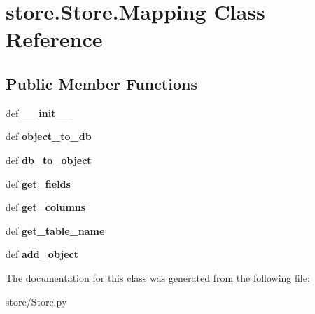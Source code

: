 \hypertarget{classstore_1_1_store_1_1_mapping}{\section{store.\-Store.\-Mapping Class Reference}
\label{classstore_1_1_store_1_1_mapping}
}
\subsection*{Public Member Functions}
\begin{DoxyCompactItemize}
\item 
\hypertarget{classstore_1_1_store_1_1_mapping_a0e1dbdc7010d1a0996c756faa297e701}{def {\bfseries \-\_\-\-\_\-init\-\_\-\-\_\-}}\label{classstore_1_1_store_1_1_mapping_a0e1dbdc7010d1a0996c756faa297e701}

\item 
\hypertarget{classstore_1_1_store_1_1_mapping_af5051c6fc20b5606cc31c03c3748819a}{def {\bfseries object\-\_\-to\-\_\-db}}\label{classstore_1_1_store_1_1_mapping_af5051c6fc20b5606cc31c03c3748819a}

\item 
\hypertarget{classstore_1_1_store_1_1_mapping_a66d071f84316d5d59cc8540c773bc3b3}{def {\bfseries db\-\_\-to\-\_\-object}}\label{classstore_1_1_store_1_1_mapping_a66d071f84316d5d59cc8540c773bc3b3}

\item 
\hypertarget{classstore_1_1_store_1_1_mapping_ac9e13f70aeaf75dba4d34b3638eb4680}{def {\bfseries get\-\_\-fields}}\label{classstore_1_1_store_1_1_mapping_ac9e13f70aeaf75dba4d34b3638eb4680}

\item 
\hypertarget{classstore_1_1_store_1_1_mapping_a129d4056b8525c6545d316a35e88f995}{def {\bfseries get\-\_\-columns}}\label{classstore_1_1_store_1_1_mapping_a129d4056b8525c6545d316a35e88f995}

\item 
\hypertarget{classstore_1_1_store_1_1_mapping_a1a43453bd3bd21bb92db9a7d74346519}{def {\bfseries get\-\_\-table\-\_\-name}}\label{classstore_1_1_store_1_1_mapping_a1a43453bd3bd21bb92db9a7d74346519}

\item 
\hypertarget{classstore_1_1_store_1_1_mapping_ab6abdf1a435b2ebb3d61af4961240028}{def {\bfseries add\-\_\-object}}\label{classstore_1_1_store_1_1_mapping_ab6abdf1a435b2ebb3d61af4961240028}

\end{DoxyCompactItemize}


The documentation for this class was generated from the following file\-:\begin{DoxyCompactItemize}
\item 
store/Store.\-py\end{DoxyCompactItemize}
